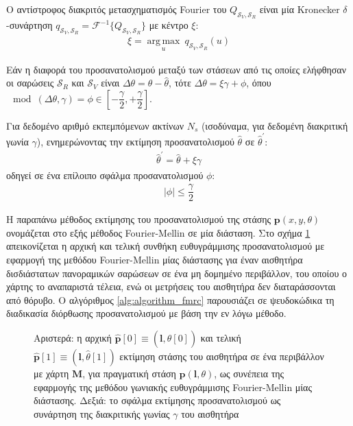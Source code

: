 Ο αντίστροφος διακριτός μετασχηματισμός Fourier του
$Q_{\mathcal{S}_V, \mathcal{S}_R}$ είναι μία Kronecker $\delta$-συνάρτηση
$q_{\mathcal{S}_V, \mathcal{S}_R} = \mathcal{F}^{-1}\{Q_{\mathcal{S}_V, \mathcal{S}_R}\}$
με κέντρο $\xi$:
\begin{align}
  \xi = \operatorname*{arg\,max}\limits_u \ q_{\mathcal{S}_V, \mathcal{S}_R}(u)
\end{align}

Εάν η διαφορά του προσανατολισμού μεταξύ των στάσεων από τις οποίες ελήφθησαν
οι σαρώσεις $\mathcal{S}_R$ και $\mathcal{S}_V$ είναι
$\Delta\theta = \theta - \hat{\theta}$, τότε
$\Delta\theta = \xi\gamma + \phi$, όπου
$\mod(\Delta\theta, \gamma) = \phi \in [-\dfrac{\gamma}{2},+\dfrac{\gamma}{2}]$.

\begin{gg_box}
\begin{remark}
  \label{remark:02_04_02:01}
  Για δεδομένο αριθμό εκπεμπόμενων ακτίνων $N_s$ (ισοδύναμα, για
  δεδομένη διακριτική γωνία $\gamma$), ενημερώνοντας την εκτίμηση
  προσανατολισμού $\hat{\theta}$ σε $\hat{\theta}^\prime$:
  \begin{align}
    \hat{\theta}^\prime = \hat{\theta} + \xi \gamma \label{eq:update_t1}
  \end{align}
  οδηγεί σε ένα επίλοιπο σφάλμα προσανατολισμού $\phi$:
  \begin{align}
    |\phi| \leq \dfrac{\gamma}{2}  \label{eq:phi_1}
  \end{align}
\end{remark}
\end{gg_box}

Η παραπάνω μέθοδος εκτίμησης του προσανατολισμού της στάσης
$\bm{p}(x,y,\theta)$ ονομάζεται στο εξής μέθοδος Fourier-Mellin σε μία
διάσταση. Στο σχήμα \ref{fig:02_04_02:rc_fm} απεικονίζεται η αρχική και τελική
συνθήκη ευθυγράμμισης προσανατολισμού με εφαρμογή της μεθόδου Fourier-Mellin
μίας διάστασης για έναν αισθητήρα δισδιάστατων πανοραμικών σαρώσεων σε ένα μη
δομημένο περιβάλλον, του οποίου ο χάρτης το αναπαριστά τέλεια, ενώ οι μετρήσεις
του αισθητήρα δεν διαταράσσονται από θόρυβο. Ο αλγόριθμος
\ref{alg:algorithm_fmrc} παρουσιάζει σε ψευδοκώδικα τη διαδικασία διόρθωσης
προσανατολισμού με βάση την εν λόγω μέθοδο.

\begin{figure}[h]\centering
  \vspace{0.5cm}
  
  \vspace{0.5cm}
  \caption{\small Αριστερά: η αρχική
           $\hat{\bm{p}}[0] \equiv (\bm{l},\hat{\theta}[0])$ και τελική
           $\hat{\bm{p}}[1] \equiv (\bm{l},\hat{\theta}[1])$ εκτίμηση στάσης του
           αισθητήρα σε ένα περιβάλλον με χάρτη $\bm{M}$, για πραγματική στάση
           $\bm{p}(\bm{l},\theta)$, ως συνέπεια της εφαρμογής της μεθόδου
           γωνιακής ευθυγράμμισης Fourier-Mellin μίας διάστασης. Δεξιά: το
           σφάλμα εκτίμησης προσανατολισμού ως συνάρτηση της διακριτικής γωνίας
           $\gamma$ του αισθητήρα}
  \label{fig:02_04_02:rc_fm}
\end{figure}

